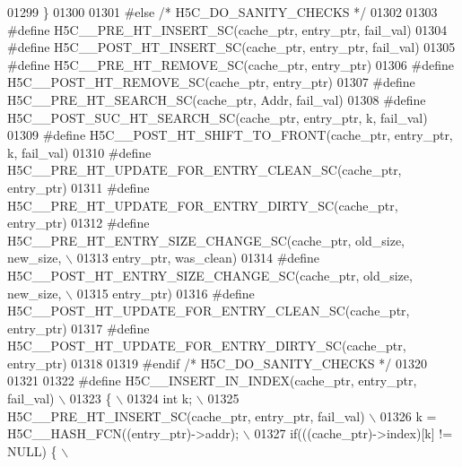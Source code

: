 \begin{DoxyCode}
01299 \textcolor{preprocessor}{\}}
01300 
01301 \textcolor{preprocessor}{#else }\textcolor{comment}{/* H5C\_DO\_SANITY\_CHECKS */}\textcolor{preprocessor}{}
01302 
01303 \textcolor{preprocessor}{#define H5C\_\_PRE\_HT\_INSERT\_SC(cache\_ptr, entry\_ptr, fail\_val)}
01304 \textcolor{preprocessor}{#define H5C\_\_POST\_HT\_INSERT\_SC(cache\_ptr, entry\_ptr, fail\_val)}
01305 \textcolor{preprocessor}{#define H5C\_\_PRE\_HT\_REMOVE\_SC(cache\_ptr, entry\_ptr)}
01306 \textcolor{preprocessor}{#define H5C\_\_POST\_HT\_REMOVE\_SC(cache\_ptr, entry\_ptr)}
01307 \textcolor{preprocessor}{#define H5C\_\_PRE\_HT\_SEARCH\_SC(cache\_ptr, Addr, fail\_val)}
01308 \textcolor{preprocessor}{#define H5C\_\_POST\_SUC\_HT\_SEARCH\_SC(cache\_ptr, entry\_ptr, k, fail\_val)}
01309 \textcolor{preprocessor}{#define H5C\_\_POST\_HT\_SHIFT\_TO\_FRONT(cache\_ptr, entry\_ptr, k, fail\_val)}
01310 \textcolor{preprocessor}{#define H5C\_\_PRE\_HT\_UPDATE\_FOR\_ENTRY\_CLEAN\_SC(cache\_ptr, entry\_ptr)}
01311 \textcolor{preprocessor}{#define H5C\_\_PRE\_HT\_UPDATE\_FOR\_ENTRY\_DIRTY\_SC(cache\_ptr, entry\_ptr)}
01312 \textcolor{preprocessor}{#define H5C\_\_PRE\_HT\_ENTRY\_SIZE\_CHANGE\_SC(cache\_ptr, old\_size, new\_size, \(\backslash\)}
01313 \textcolor{preprocessor}{                                 entry\_ptr, was\_clean)}
01314 \textcolor{preprocessor}{#define H5C\_\_POST\_HT\_ENTRY\_SIZE\_CHANGE\_SC(cache\_ptr, old\_size, new\_size, \(\backslash\)}
01315 \textcolor{preprocessor}{                                  entry\_ptr)}
01316 \textcolor{preprocessor}{#define H5C\_\_POST\_HT\_UPDATE\_FOR\_ENTRY\_CLEAN\_SC(cache\_ptr, entry\_ptr)}
01317 \textcolor{preprocessor}{#define H5C\_\_POST\_HT\_UPDATE\_FOR\_ENTRY\_DIRTY\_SC(cache\_ptr, entry\_ptr)}
01318 
01319 \textcolor{preprocessor}{#endif }\textcolor{comment}{/* H5C\_DO\_SANITY\_CHECKS */}\textcolor{preprocessor}{}
01320 
01321 
01322 \textcolor{preprocessor}{#define H5C\_\_INSERT\_IN\_INDEX(cache\_ptr, entry\_ptr, fail\_val)                 \(\backslash\)}
01323 \textcolor{preprocessor}{\{                                                                            \(\backslash\)}
01324 \textcolor{preprocessor}{    int k;                                                                   \(\backslash\)}
01325 \textcolor{preprocessor}{    H5C\_\_PRE\_HT\_INSERT\_SC(cache\_ptr, entry\_ptr, fail\_val)                    \(\backslash\)}
01326 \textcolor{preprocessor}{    k = H5C\_\_HASH\_FCN((entry\_ptr)->addr);                                    \(\backslash\)}
01327 \textcolor{preprocessor}{    if(((cache\_ptr)->index)[k] != NULL) \{                                    \(\backslash\)}

\end{DoxyCode}
